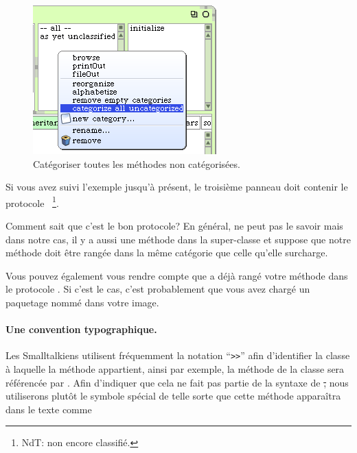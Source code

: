 \documentclass[a4paper,10pt,twoside]{book}
\begin{document}
\begin{figure}[htbp]
   \centering
   \includegraphics[scale=0.7]{Categorize} 
   \caption{Catégoriser toutes les méthodes non catégorisées.\label{fig:categorize}}
\end{figure}

Si vous avez suivi l'exemple jusqu'à présent, le troisième panneau doit contenir le protocole ~\footnote{NdT: non encore classifié.}.

Comment \sq sait que c'est le bon protocole? En général,
\sq ne peut pas le savoir mais dans notre cas, il y a aussi une méthode  dans la super-classe et \sq suppose que notre méthode  doit \^etre rangée dans la m\^eme catégorie que celle qu'elle surcharge.

Vous pouvez également vous rendre compte que \sq a déjà rangé votre
méthode  dans le protocole . Si
c'est le cas, c'est probablement que vous avez chargé un paquetage nommé  dans votre image.

\paragraph{Une convention typographique.} Les Smalltalkiens utilisent fréquemment la notation ``\verb|>>|'' afin d'identifier la classe à laquelle la méthode appartient, ainsi par exemple, la méthode  de la classe  sera référencée par .
Afin d'indiquer que cela ne fait pas partie de la syntaxe de \st, nous utiliserons plutôt le symbole spécial \ct{>>>} de telle sorte que cette méthode apparaîtra dans le texte comme 
\end{document}
